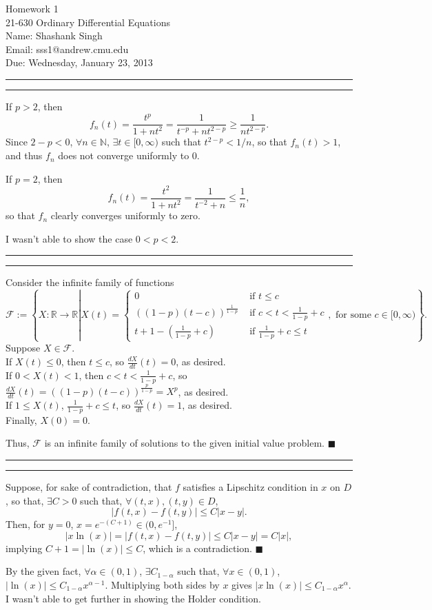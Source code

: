 \documentclass[11pt]{article}
\makeatletter
\newcounter{questionCounter}
\newcounter{partCounter}[questionCounter]
\newenvironment{question}[2][\arabic{questionCounter}]{%
    \setcounter{partCounter}{0}%
    \vspace{.25in} \hrule \vspace{0.5em}%
        \noindent{\bf #2}%
    \vspace{0.8em} \hrule \vspace{.10in}%
    \addtocounter{questionCounter}{1}%
}{}
\newcommand{\myname}{Shashank Singh}
\newcommand{\myandrew}{sss1@andrew.cmu.edu}
\newcommand{\myclass}{21-630 Ordinary Differential Equations}
\newcommand{\myhwnum}{1}
\newcommand{\duedate}{Wednesday, January 23, 2013}
\renewcommand{\qed}{\quad $\blacksquare$}
\newcommand{\inv}{^{-1}}
\newcommand{\N}{\mathbb{N}} %
\newcommand{\R}{\mathbb{R}} %
\newcommand{\F}{\mathcal{F}}
\makeatother
\begin{document}
\thispagestyle{plain}

{\Large Homework \myhwnum} \\
\myclass \\
Name: \myname \\
Email: \myandrew \\
Due: \duedate \\
\begin{question}{Problem 1}
If $p > 2$, then
\[f_n(t)
 = \frac{t^p}{1 + nt^2}
 = \frac{1}{t^{-p} + nt^{2 - p}}
 \geq \frac{1}{nt^{2 - p}}.
\]
Since $2 - p < 0$, $\forall n \in \N$, $\exists t \in [0,\infty)$ such that
$t^{2 - p} < 1/n$, so that $f_n(t) > 1$, and thus $f_n$ does not converge
uniformly to $0$.

If $p = 2$, then
\[f_n(t) = \frac{t^2}{1 + nt^2} = \frac{1}{t^{-2} + n} \leq \frac{1}{n},\]
so that $f_n$ clearly converges uniformly to zero.

I wasn't able to show the case $0 < p < 2$.
\end{question}

\begin{question}{Problem 2}
Consider the infinite family of functions
\[\F := \left\{X : \R \rightarrow \R \left|
 X(t) = \left\{ \begin{array}{lc}
       0 & \mbox{ if } t \leq c \\
       ((1 - p)(t - c))^{\frac{1}{1 - p}} & \mbox{ if } c < t <
\frac{1}{1 - p} + c \\
       t + 1 - \left( \frac{1}{1 - p} + c\right) & \mbox{ if } \frac{1}{1 - p} + c \leq t
     \end{array} \right. \right., \mbox{ for some } c \in [0,\infty) \right\}.
\]
Suppose $X \in \F$. \\
If $X(t) \leq 0$, then $t \leq c$, so $\frac{dX}{dt}(t) = 0$, as desired. \\
If $0 < X(t) < 1$, then $c < t < \frac{1}{1 - p} + c$, so
$\frac{dX}{dt}(t) = ((1 - p)(t - c))^{\frac{p}{1 - p}} = X^p$, as desired. \\
If $1 \leq X(t)$, $\frac{1}{1 - p} + c \leq t$, so $\frac{dX}{dt}(t) = 1$,
as desired. \\
Finally, $X(0) = 0$.

Thus, $\F$ is an infinite family of solutions to the given initial value
problem. \qed
\end{question}

\newpage
\begin{question}{Problem 3}
Suppose, for sake of contradiction, that $f$ satisfies a Lipschitz condition in
$x$ on $D$, so that, $\exists C > 0$ such that, $\forall (t,x),(t,y) \in D$,
\[|f(t,x) - f(t,y)| \leq C|x - y|.\]
Then, for $y = 0$, $x = e^{-(C + 1)} \in (0,e\inv]$,
\[|x\ln(x)| = |f(t,x) - f(t,y)| \leq C|x - y| = C|x|,\]
implying $C + 1 = |\ln(x)| \leq C$, which is a contradiction. \qed

By the given fact, $\forall \alpha \in (0,1)$, $\exists C_{1 - \alpha}$ such
that, $\forall x \in (0,1)$, $|\ln(x)| \leq C_{1 - \alpha}x^{\alpha - 1}$.
Multiplying both sides by $x$ gives $|x\ln(x)| \leq C_{1 - \alpha}x^{\alpha}$.
I wasn't able to get further in showing the Holder condition.
\end{question}
\end{document}
